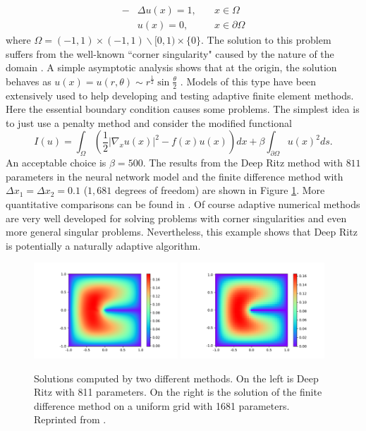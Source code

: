 \documentclass[12pt]{article}
\theoremstyle{definition}
\begin{document}
\begin{equation}
\begin{aligned}
-&\Delta u(x)=1,\quad &x\in \Omega\\
&u(x)=0,\quad &x\in \partial \Omega
\end{aligned}
\end{equation}
where $\Omega=(-1,1)\times (-1,1) \backslash [0,1)\times \{0\}$.
The solution to this problem suffers from the well-known ``corner singularity"
caused by the nature of the domain \cite{strang1973analysis}.
A simple asymptotic analysis shows that at the origin,  the solution
behaves as
$u(x)=u(r,\theta) \sim r^{\frac{1}{2}}\sin\frac{\theta}{2}$
\cite{strang1973analysis}.
Models of this type have been extensively used
to help developing and testing adaptive finite element methods.
Here the essential boundary condition causes some problems.
The simplest idea is to just  use a penalty method and consider
the modified functional
\begin{equation}
I(u) = \int_\Omega \left( \frac{1}{2} |\nabla_x u(x)|^2 - f(x) u(x) \right) dx
+\beta \int_{\partial \Omega} u(x)^2 ds.
\end{equation}
An acceptable choice is $\beta = 500$.
The results from the Deep Ritz method 
with $811$ parameters in the neural network model
and the finite difference method with $\Delta x_1=\Delta x_2=0.1$ ($1,681$
degrees of freedom) are shown in Figure \ref{fig:ritz}.
More quantitative comparisons can be found in \cite{E2018deep}.
Of course adaptive numerical methods are very well developed for solving
problems with corner singularities and even more general singular problems.
Nevertheless, this example shows that Deep Ritz is potentially a naturally
adaptive algorithm.
\begin{figure}
\centering
\includegraphics[width=0.48\textwidth,height=0.3\textwidth]{figs/pe_01.pdf}
\includegraphics[width=0.48\textwidth,height=0.3\textwidth]{figs/pe_01_d.pdf}
\caption{Solutions computed by two different methods. On the left is Deep Ritz with
811 parameters. On the right is the solution of the finite difference method on a uniform
grid with 1681 parameters.
Reprinted from \cite{E2018deep}.
}
\label{fig:ritz}
\end{figure}
\end{document}

